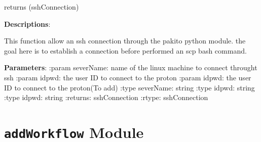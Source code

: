 \documentclass[letterpaper,10pt,english]{sphinxmanual}
\begin{document}

\begin{fulllineitems}
\label{datamanagerpkg:datamanagerpkg.ProtonCommunication_data_manager.mainGetCNVData}
\end{fulllineitems}


\begin{fulllineitems}
\label{datamanagerpkg:datamanagerpkg.ProtonCommunication_data_manager.sshConnection}
returns (sshConnection)

\textbf{Descriptions}:

This function allow an ssh connection through the  pakito python module.
the goal here is to establish a connection before performed an scp bash
command.

\textbf{Parameters}:
:param severName: name of the linux machine to connect throught ssh
:param idpwd: the user ID to connect to the proton
:param idpwd: the user ID to connect to the proton(To add) 
:type severName: string
:type idpwd: string
:type idpwd: string
:returns: sshConnection
:rtype: sshConnection

\end{fulllineitems}



\section{\texttt{addWorkflow} Module}
\label{datamanagerpkg:module-datamanagerpkg.addWorkflow}\label{datamanagerpkg:addworkflow-module}

\begin{fulllineitems}
\label{datamanagerpkg:datamanagerpkg.addWorkflow.CNV_Input_Dict}
\end{fulllineitems}
\end{document}
